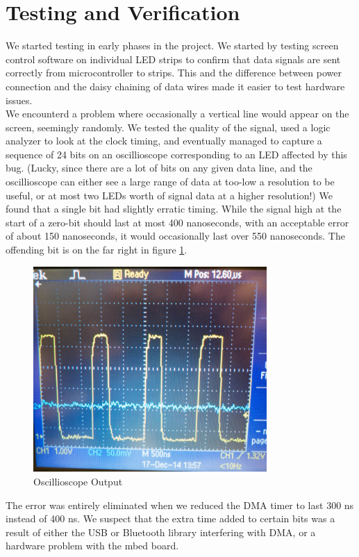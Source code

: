\documentclass[10pt,twocolumn]{article}
\begin{document}
\section{\textbf{Testing and Verification}} 
We started testing in early phases in the project. We started by testing
screen control software on individual LED strips to confirm that data signals
are sent correctly from microcontroller to strips. This and the difference
between power connection and the daisy chaining of data wires made it easier
to test hardware issues.\\
We encounterd a problem where occasionally a vertical line would appear on the
screen, seemingly randomly. We tested the quality of the signal, used a logic
analyzer to look at the clock timing, and eventually managed to capture a
sequence of 24 bits on an oscillioscope corresponding to an LED affected by
this bug. (Lucky, since there are a lot of bits on any given data line, and
the oscillioscope can either see a large range of data at too-low a resolution
to be useful, or at most two LEDs worth of signal data at a higher
resolution!) We found that a single bit had slightly erratic timing. While the
signal high at the start of a zero-bit should last at most 400 nanoseconds,
with an acceptable error of about 150 nanoseconds, it would
occasionally last over 550 nanoseconds. The offending bit is on the
far right in figure \ref{oscope}.
\begin{figure}[H]
    \includegraphics[width=3.5in]{oscope.jpg}
    \caption{Oscillioscope Output}
    \label{oscope}
\end{figure}
The error was entirely eliminated when we reduced the DMA timer to last 300 ns instead
of 400 ns. We suspect that the extra time added to certain bits was a result
of either the USB or Bluetooth library interfering with DMA, or a hardware
problem with the mbed board.
\end{document}
